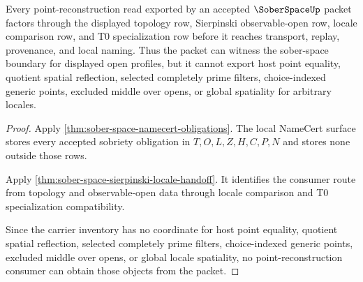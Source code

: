 \begin{theorem}
\label{thm:sober-space-point-reconstruction-nonescape}
Every point-reconstruction read exported by an accepted $\SoberSpaceUp$ packet factors through the displayed topology row, Sierpinski observable-open row, locale comparison row, and T0 specialization row before it reaches transport, replay, provenance, and local naming. Thus the packet can witness the sober-space boundary for displayed open profiles, but it cannot export host point equality, quotient spatial reflection, selected completely prime filters, choice-indexed generic points, excluded middle over opens, or global spatiality for arbitrary locales.
\end{theorem}
\begin{proof}
Apply \autoref{thm:sober-space-namecert-obligations}. The local NameCert surface stores every accepted sobriety obligation in $T,O,L,Z,H,C,P,N$ and stores none outside those rows.

Apply \autoref{thm:sober-space-sierpinski-locale-handoff}. It identifies the consumer route from topology and observable-open data through locale comparison and T0 specialization compatibility.

Since the carrier inventory has no coordinate for host point equality, quotient spatial reflection, selected completely prime filters, choice-indexed generic points, excluded middle over opens, or global locale spatiality, no point-reconstruction consumer can obtain those objects from the packet.
\end{proof}





